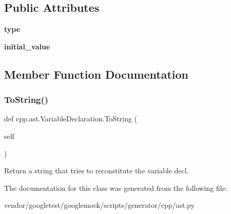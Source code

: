 \subsection*{Public Attributes}
\begin{DoxyCompactItemize}
\item 
\mbox{\label{classcpp_1_1ast_1_1_variable_declaration_a8c7cc8578ea12f93c6e1c5c6ef4ddf99}} 
{\bfseries type}
\item 
\mbox{\label{classcpp_1_1ast_1_1_variable_declaration_a7c259ca42a06e264679e8ab66e7ea374}} 
{\bfseries initial\+\_\+value}
\end{DoxyCompactItemize}


\subsection{Member Function Documentation}
\mbox{\label{classcpp_1_1ast_1_1_variable_declaration_a047aa4afddf7b7823a4095cea9477a21}} 
\subsubsection{\texorpdfstring{To\+String()}{ToString()}}
{\footnotesize\ttfamily def cpp.\+ast.\+Variable\+Declaration.\+To\+String (\begin{DoxyParamCaption}\item[{}]{self }\end{DoxyParamCaption})}

\begin{DoxyVerb}Return a string that tries to reconstitute the variable decl.\end{DoxyVerb}
 

The documentation for this class was generated from the following file\+:\begin{DoxyCompactItemize}
\item 
vendor/googletest/googlemock/scripts/generator/cpp/ast.\+py\end{DoxyCompactItemize}
